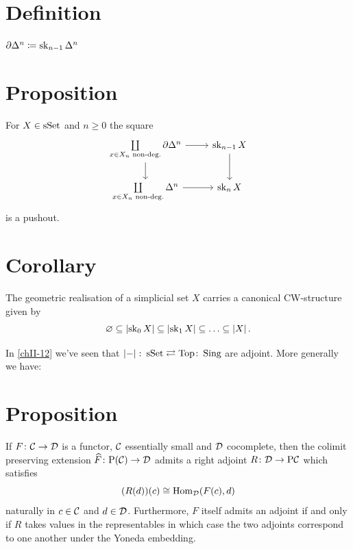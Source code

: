     \section{Definition}
        $\partial \Delta^n \coloneq \operatorname{sk}_{n-1} \Delta^n$
    \section{Proposition}\label{chII-16}
        For $X \in \operatorname{sSet}$ and $n \geq 0$ the square
        \begin{equation*}
            \begin{tikzcd}
                \coprod\limits_{x \in X_n \text{ non-deg.}} \partial \Delta^n \arrow[d] \arrow[r] & \sk_{n-1}X \arrow[d] \\
                \coprod\limits_{x \in X_n \text{ non-deg.}} \Delta^n \arrow[r]                    & \sk_nX              
            \end{tikzcd}
        \end{equation*}
        is a pushout.
    \section{Corollary}
        The geometric realisation of a simplicial set $X$ carries a canonical CW-structure given by
        \begin{equation*}
            \varnothing \subseteq \left| \operatorname{sk}_0 X \right| \subseteq \left| \operatorname{sk}_1 X \right| \subseteq \ldots \subseteq \left| X \right|.
        \end{equation*}
        \medskip

        In \ref{chII-12} we've seen that $\left| - \right| \colon \operatorname{sSet} \rightleftarrows \operatorname{Top} \colon \operatorname{Sing}$ are adjoint. More generally we have:

    \section{Proposition}
        If $F \colon \mathcal{C} \to \mathcal{D}$ is a functor, $\mathcal{C}$ essentially small and $\mathcal{D}$ cocomplete, then the colimit preserving extension $\widehat{F} \colon \mathrm{P}(\mathcal{C}) \to \mathcal{D}$ admits a right adjoint $R \colon \mathcal{D} \to \mathrm{P}{\mathcal{C}}$ which satisfies
        \begin{equation*}
            (R(d))(c) \cong \operatorname{Hom}_{\mathcal{D}}(F(c), d)
        \end{equation*}
        naturally in $c \in \mathcal{C}$ and $d \in \mathcal{D}$. Furthermore, $F$ itself admits an adjoint if and only if $R$ takes values in the representables in which case the two adjoints correspond to one another under the Yoneda embedding.

